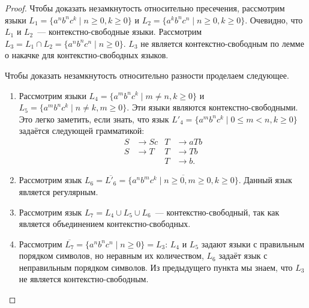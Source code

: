 \begin{proof}
    Чтобы доказать незамкнутость относительно пресечения, рассмотрим языки $L_1 = \{a^n b^n c^k \mid n \geq 0, k \geq 0\}$ и $L_2 = \{a^k b^n c^n \mid n \geq 0, k \geq 0\}$.
    Очевидно, что $L_1$ и $L_2$~--- контекстно-свободные языки.
    Рассмотрим $L_3 = L_1 \cap L_2 = \{a^n b^n c^n \mid n \geq 0\}$.
    $L_3$ не является контекстно-свободным по лемме о накачке для контекстно-свободных языков.

    Чтобы доказать незамкнутость относительно разности проделаем следующее.
    \begin{enumerate}
        \item Рассмотрим языки $L_4 = \{a^m b^n c^k \mid m \neq n, k \geq 0\}$ и $L_5 = \{a^m b^n c^k \mid n \neq k, m \geq 0\}$.
              Эти языки являются контекстно-свободными.
              Это легко заметить, если знать, что язык $L'_4 = \{a^m b^n c^k \mid 0 \leq m < n, k \geq 0\}$ задаётся следующей грамматикой:
              \begin{align*}
                  S & \to S c & T & \to a T b \\
                  S & \to T   & T & \to T b   \\
                    &         & T & \to b.
              \end{align*}
        \item Рассмотрим язык $L_6 = \overline{L'_6} = \overline{\{a^n b^m c^k \mid n \geq 0, m \geq 0, k \geq 0\}}$.
              Данный язык является регулярным.
        \item Рассмотрим язык $L_7 = L_4 \cup L_5 \cup L_6$~--- контекстно-свободный, так как является объединением контекстно-свободных.
        \item Рассмотрим $\overline{L_7} = \{a^n b^n c^n \mid n \geq 0\} = L_3$: $L_4$ и $L_5$ задают языки с правильным порядком символов, но неравным их количеством, $L_6$ задаёт язык с неправильным порядком символов.
              Из предыдущего пункта мы знаем, что $L_3$  не является контекстно-свободным.
              \qedhere
    \end{enumerate}
\end{proof}




